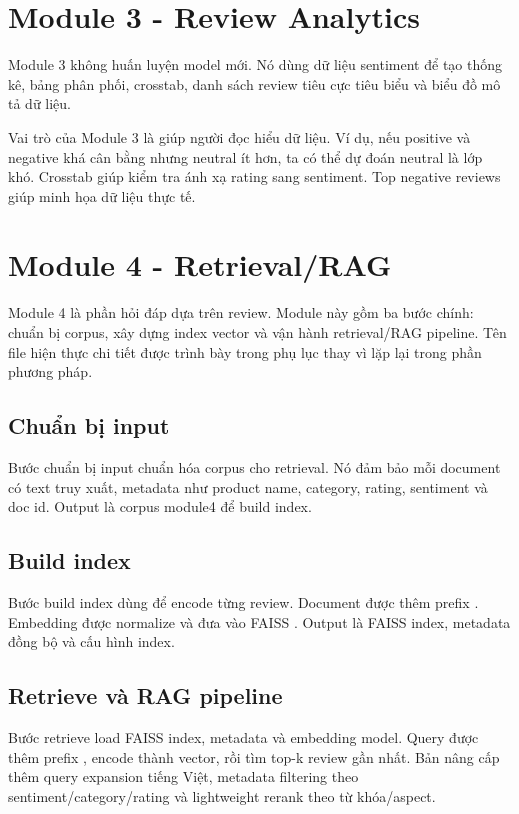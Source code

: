 \section{Module 3 - Review Analytics}
Module 3 không huấn luyện model mới. Nó dùng dữ liệu sentiment để tạo thống kê, bảng phân phối, crosstab, danh sách review tiêu cực tiêu biểu và biểu đồ mô tả dữ liệu.

Vai trò của Module 3 là giúp người đọc hiểu dữ liệu. Ví dụ, nếu positive và negative khá cân bằng nhưng neutral ít hơn, ta có thể dự đoán neutral là lớp khó. Crosstab \RatingSentiment{} giúp kiểm tra ánh xạ rating sang sentiment. Top negative reviews giúp minh họa dữ liệu thực tế.

\section{Module 4 - Retrieval/RAG}
Module 4 là phần hỏi đáp dựa trên review. Module này gồm ba bước chính: chuẩn bị corpus, xây dựng index vector và vận hành retrieval/RAG pipeline. Tên file hiện thực chi tiết được trình bày trong phụ lục thay vì lặp lại trong phần phương pháp.

\subsection{Chuẩn bị input}
Bước chuẩn bị input chuẩn hóa corpus cho retrieval. Nó đảm bảo mỗi document có text truy xuất, metadata như product name, category, rating, sentiment và doc id. Output là corpus module4 để build index.

\subsection{Build index}
Bước build index dùng \MultilingualE{} để encode từng review. Document được thêm prefix . Embedding được normalize và đưa vào FAISS . Output là FAISS index, metadata đồng bộ và cấu hình index.

\subsection{Retrieve và RAG pipeline}
Bước retrieve load FAISS index, metadata và embedding model. Query được thêm prefix , encode thành vector, rồi tìm top-k review gần nhất. Bản nâng cấp thêm query expansion tiếng Việt, metadata filtering theo sentiment/category/rating và lightweight rerank theo từ khóa/aspect.

